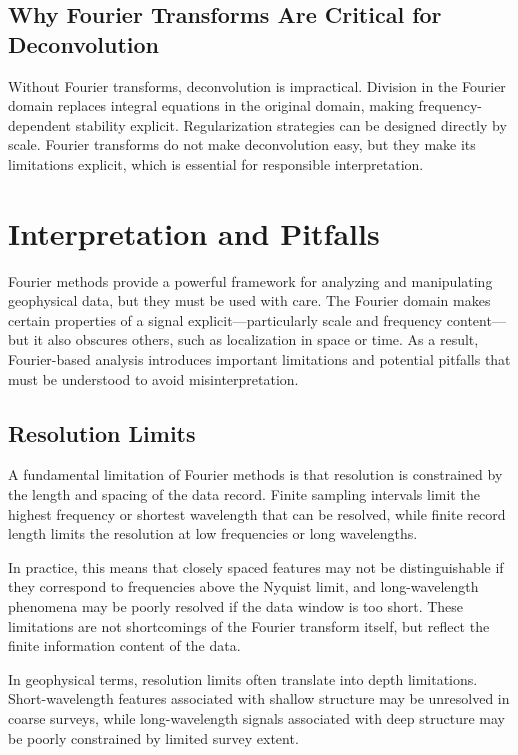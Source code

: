 \subsection{Why Fourier Transforms Are Critical for Deconvolution}

Without Fourier transforms, deconvolution is impractical. Division in the Fourier domain replaces integral equations in the original domain, making frequency-dependent stability explicit. Regularization strategies can be designed directly by scale. Fourier transforms do not make deconvolution easy, but they make its limitations explicit, which is essential for responsible interpretation.

\section{Interpretation and Pitfalls}

Fourier methods provide a powerful framework for analyzing and manipulating geophysical data, but they must be used with care. The Fourier domain makes certain properties of a signal explicit—particularly scale and frequency content—but it also obscures others, such as localization in space or time. As a result, Fourier-based analysis introduces important limitations and potential pitfalls that must be understood to avoid misinterpretation.

\subsection{Resolution Limits}

A fundamental limitation of Fourier methods is that resolution is constrained by the length and spacing of the data record. Finite sampling intervals limit the highest frequency or shortest wavelength that can be resolved, while finite record length limits the resolution at low frequencies or long wavelengths.

In practice, this means that closely spaced features may not be distinguishable if they correspond to frequencies above the Nyquist limit, and long-wavelength phenomena may be poorly resolved if the data window is too short. These limitations are not shortcomings of the Fourier transform itself, but reflect the finite information content of the data.

In geophysical terms, resolution limits often translate into depth limitations. Short-wavelength features associated with shallow structure may be unresolved in coarse surveys, while long-wavelength signals associated with deep structure may be poorly constrained by limited survey extent.

